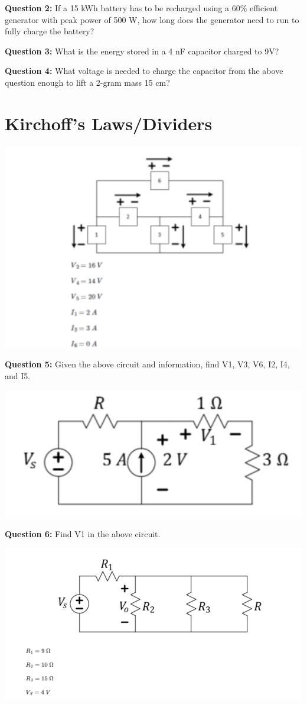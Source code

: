 \documentclass{article}
\begin{document}
\textbf{Question 2:} If a 15 kWh battery has to be recharged using a 60\% efficient generator with peak power of 500 W, how long does the generator need to run to fully charge the battery?

\textbf{Question 3:} What is the energy stored in a 4 nF capacitor charged to 9V?

\textbf{Question 4:} What voltage is needed to charge the capacitor from the above question enough to lift a 2-gram mass 15 cm?

\section*{Kirchoff's Laws/Dividers}

\begin{center}
    \includegraphics[width=0.75\linewidth]{figures/2.png}
\end{center}

\textbf{Question 5:} Given the above circuit and information, find V1, V3, V6, I2, I4, and I5.

\begin{center}
    \includegraphics[width=0.75\linewidth]{figures/3.png}
\end{center}

\textbf{Question 6:} Find V1 in the above circuit.

\begin{center}

    \includegraphics[width=0.75\linewidth]{figures/5.png}

\end{center}
\end{document}
